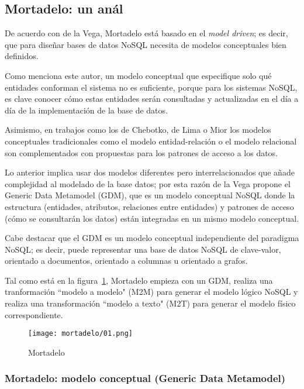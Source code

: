 \subsection{Mortadelo: un anál}
De acuerdo con de la Vega\cite{de_la_vega_mortadelo_2020}, Mortadelo está basado en el \textit{model driven}; es decir, que para diseñar bases de datos NoSQL necesita de modelos conceptuales bien definidos.


Como menciona este autor, un modelo conceptual que especifique solo qué entidades conforman el sistema no es suficiente, porque para los sistemas NoSQL, es clave conocer cómo estas entidades serán consultadas y actualizadas en el día a día de la implementación de la base de datos.


Asimismo, en trabajos como los de Chebotko\cite{chebotko_big_2015}, de Lima\cite{de_lima_workload-driven_2015} o Mior\cite{mior_nose_2017-1} los modelos conceptuales tradicionales como el modelo entidad-relación o el modelo relacional son complementados con propuestas para los patrones de acceso a los datos.


Lo anterior implica usar dos modelos diferentes pero interrelacionados que añade complejidad al modelado de la base datos; por esta razón de la Vega propone el Generic Data Metamodel (GDM), que es un modelo conceptual NoSQL donde la estructura (entidades, atributos, relaciones entre entidades) y patrones de acceso (cómo se consultarán los datos) están integradas en un mismo modelo conceptual.


Cabe destacar que el GDM es un modelo conceptual independiente del paradigma NoSQL; es decir, puede representar una base de datos NoSQL de clave-valor, orientado a documentos, orientado a columnas u orientado a grafos.


Tal como está en la figura~\ref{img:mortadelo-process}, Mortadelo empieza con un GDM, realiza una tranformación ``modelo a modelo" (M2M) para generar el modelo lógico NoSQL y realiza una transformación ``modelo a texto" (M2T) para generar el modelo físico correspondiente.


\begin{figure}[h!t] 
    \centering
    \texttt{[image: mortadelo/01.png]}
    \caption{Mortadelo}
    \label{img:mortadelo-process}
\end{figure}

\subsubsection*{Mortadelo: modelo conceptual (Generic Data Metamodel)}

